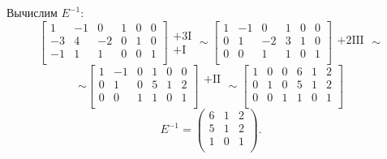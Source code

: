 \begin{enumerate}
	      Вычислим \(E^{-1}\):
	      \[
		      \left[
			      \begin{array}{ccc|ccc}
				      1  & -1 & 0  & 1 & 0 & 0 \\
				      -3 & 4  & -2 & 0 & 1 & 0 \\
				      -1 & 1  & 1  & 0 & 0 & 1 \\
			      \end{array}
			      \right]
		      \begin{array}{c}
			      \\
			      +3 \text{I} \\
			      +\text{I}   \\
		      \end{array}
		      \sim
		      \left[
			      \begin{array}{ccc|ccc}
				      1 & -1 & 0  & 1 & 0 & 0 \\
				      0 & 1  & -2 & 3 & 1 & 0 \\
				      0 & 0  & 1  & 1 & 0 & 1 \\
			      \end{array}
			      \right]
		      \begin{array}{c}
			      \\
			      +2 \text{III} \\
			      \\
		      \end{array}
		      \sim
	      \]
	      \[
		      \sim
		      \left[
			      \begin{array}{ccc|ccc}
				      1 & -1 & 0 & 1 & 0 & 0 \\
				      0 & 1  & 0 & 5 & 1 & 2 \\
				      0 & 0  & 1 & 1 & 0 & 1 \\
			      \end{array}
			      \right]
		      \begin{array}{c}
			      +\text{II} \\
			      \\
			      \\
		      \end{array}
		      \sim
		      \left[
			      \begin{array}{ccc|ccc}
				      1 & 0 & 0 & 6 & 1 & 2 \\
				      0 & 1 & 0 & 5 & 1 & 2 \\
				      0 & 0 & 1 & 1 & 0 & 1 \\
			      \end{array}
			      \right]
	      \]
	      \[
		      E^{-1} = \begin{pmatrix}
			      6 & 1 & 2 \\
			      5 & 1 & 2 \\
			      1 & 0 & 1 \\
		      \end{pmatrix}.
	      \]


\end{enumerate}
